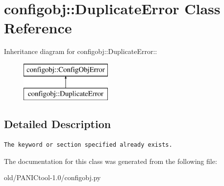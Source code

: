 \section{configobj::Duplicate\-Error Class Reference}
\label{classconfigobj_1_1DuplicateError}
Inheritance diagram for configobj::Duplicate\-Error::\begin{figure}[H]
\begin{center}
\leavevmode
\includegraphics[height=2cm]{classconfigobj_1_1DuplicateError}
\end{center}
\end{figure}


\subsection{Detailed Description}


\footnotesize\begin{verbatim}
The keyword or section specified already exists.
\end{verbatim}
\normalsize
 



The documentation for this class was generated from the following file:\begin{CompactItemize}
\item 
old/PANICtool-1.0/configobj.py\end{CompactItemize}
